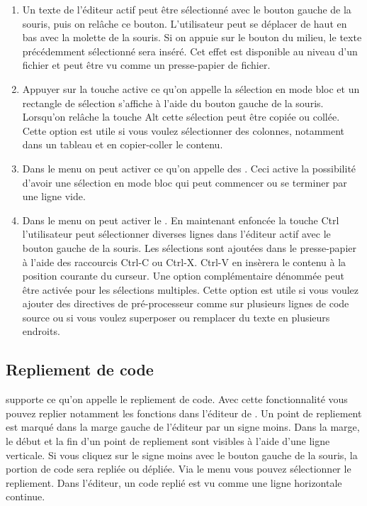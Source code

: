 \begin{enumerate}
\item Un texte de l'éditeur actif peut être sélectionné avec le bouton gauche de la souris, puis on relâche ce bouton. L'utilisateur peut se déplacer de haut en bas avec la molette de la souris. Si on appuie sur le bouton du milieu, le texte précédemment sélectionné sera inséré. Cet effet est disponible au niveau d'un fichier et peut être vu comme un presse-papier de fichier.
\item Appuyer sur la touche  active ce qu'on appelle la sélection en mode bloc et un rectangle de sélection s'affiche à l'aide du bouton gauche de la souris. Lorsqu'on relâche la touche Alt cette sélection peut être copiée ou collée. Cette option est utile si vous voulez sélectionner des colonnes, notamment dans un tableau et en copier-coller le contenu.
\item Dans le menu  on peut activer ce qu'on appelle des . Ceci active la possibilité d'avoir une sélection en mode bloc qui peut commencer ou se terminer par une ligne vide.
\item Dans le menu  on peut activer le . En maintenant enfoncée la touche Ctrl l'utilisateur peut sélectionner diverses lignes dans l'éditeur actif avec le bouton gauche de la souris. Les sélections sont ajoutées dans le presse-papier à l'aide des raccourcis Ctrl-C ou Ctrl-X. Ctrl-V en insèrera le contenu à la position courante du curseur. Une option complémentaire dénommée   peut être activée pour les sélections multiples. Cette option est utile si vous voulez ajouter des directives de pré-processeur comme  sur plusieurs lignes de code source ou si vous voulez superposer ou remplacer du texte en plusieurs endroits.
\end{enumerate}


\subsection{Repliement de code}

\codeblocks supporte ce qu'on appelle le repliement de code. Avec cette fonctionnalité vous pouvez replier notamment les fonctions dans l'éditeur de \codeblocks. Un point de repliement est marqué dans la marge gauche de
l'éditeur par un signe moins. Dans la marge, le début et la fin d'un point de repliement sont visibles à l'aide d'une ligne verticale. Si vous cliquez sur le signe moins avec le bouton gauche de la souris, la portion de code sera repliée ou dépliée. Via le menu  vous pouvez sélectionner le repliement. Dans l'éditeur, un code replié est vu comme une ligne horizontale continue.

